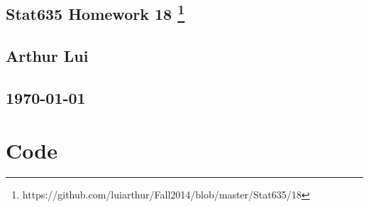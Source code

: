 \documentclass{article}
\begin{document}


\begin{center}
  \section*{\textbf{Stat635 Homework 18}
    \footnote{https://github.com/luiarthur/Fall2014/blob/master/Stat635/18}
  }  
  \subsection*{\textbf{Arthur Lui}}
  \subsection*{\noindent\today}
\end{center}

\section{Code}

\end{document}
